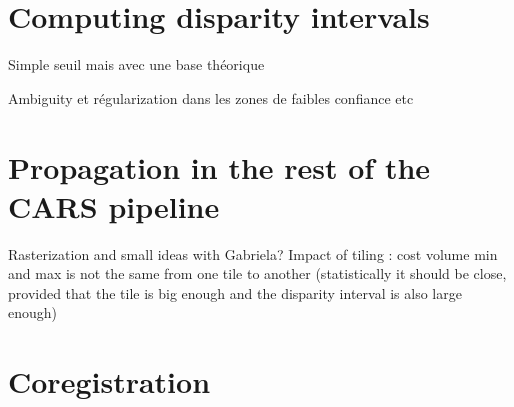 \section{Computing disparity intervals}
Simple seuil mais avec une base théorique

Ambiguity et régularization dans les zones de faibles confiance etc
\section{Propagation in the rest of the CARS pipeline}
Rasterization and small ideas with Gabriela?
Impact of tiling : cost volume min and max is not the same from one tile to another (statistically it should be close, provided that the tile is big enough and the disparity interval is also large enough)
\section{Coregistration}
\pagebreak